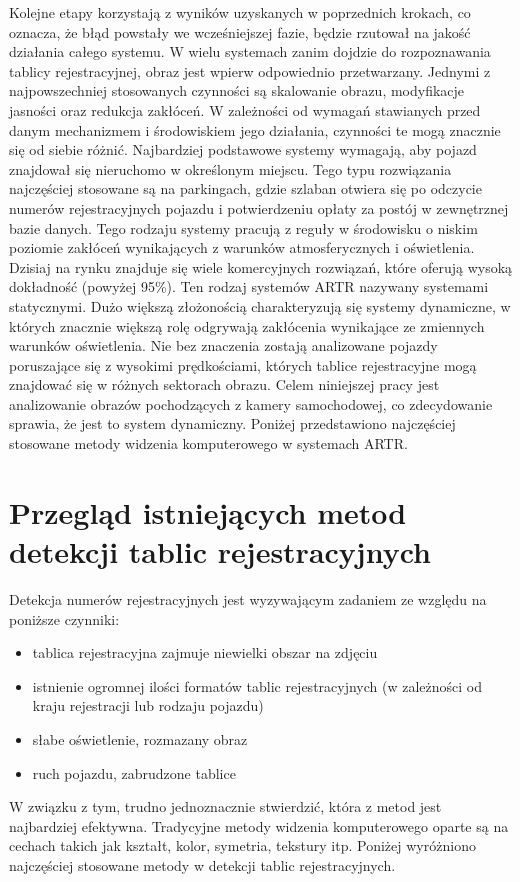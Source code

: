 Kolejne etapy korzystają z wyników uzyskanych w poprzednich krokach, co oznacza, że błąd powstały we wcześniejszej fazie, będzie rzutował na jakość działania całego systemu.
W wielu systemach zanim dojdzie do rozpoznawania tablicy rejestracyjnej, obraz jest wpierw odpowiednio przetwarzany.
Jednymi z najpowszechniej stosowanych czynności są skalowanie obrazu, modyfikacje jasności oraz redukcja zakłóceń.
W zależności od wymagań stawianych przed danym mechanizmem i środowiskiem jego działania, czynności te mogą znacznie się od siebie różnić.
Najbardziej podstawowe systemy wymagają, aby pojazd znajdował się nieruchomo w określonym miejscu.
Tego typu rozwiązania najczęściej stosowane są na parkingach, gdzie szlaban otwiera się po odczycie numerów rejestracyjnych pojazdu i potwierdzeniu opłaty za postój w zewnętrznej bazie danych.
Tego rodzaju systemy pracują z reguły w środowisku o niskim poziomie zakłóceń wynikających z warunków atmosferycznych i oświetlenia.
Dzisiaj na rynku znajduje się wiele komercyjnych rozwiązań, które oferują wysoką dokładność (powyżej 95\%).
Ten rodzaj systemów ARTR nazywany systemami statycznymi.
Dużo większą złożonością charakteryzują się systemy dynamiczne, w których znacznie większą rolę odgrywają zakłócenia wynikające ze zmiennych warunków oświetlenia.
Nie bez znaczenia zostają analizowane pojazdy poruszające się z wysokimi prędkościami, których tablice rejestracyjne mogą znajdować się w różnych sektorach obrazu.
Celem niniejszej pracy jest analizowanie obrazów pochodzących z kamery samochodowej, co zdecydowanie sprawia, że jest to system dynamiczny.
Poniżej przedstawiono najczęściej stosowane metody widzenia komputerowego w systemach ARTR.


\section{Przegląd istniejących metod detekcji tablic rejestracyjnych}

Detekcja numerów rejestracyjnych jest wyzywającym zadaniem ze względu na poniższe czynniki:
\begin{itemize}
    \item tablica rejestracyjna zajmuje niewielki obszar na zdjęciu
    \item istnienie ogromnej ilości formatów tablic rejestracyjnych (w zależności od kraju rejestracji lub rodzaju pojazdu)
    \item słabe oświetlenie, rozmazany obraz
    \item ruch pojazdu, zabrudzone tablice
\end{itemize}
W związku z tym, trudno jednoznacznie stwierdzić, która z metod jest najbardziej efektywna.
Tradycyjne metody widzenia komputerowego oparte są na cechach takich jak kształt, kolor, symetria, tekstury itp.\cite{9310202}
Poniżej wyróżniono najczęściej stosowane metody w detekcji tablic rejestracyjnych.

